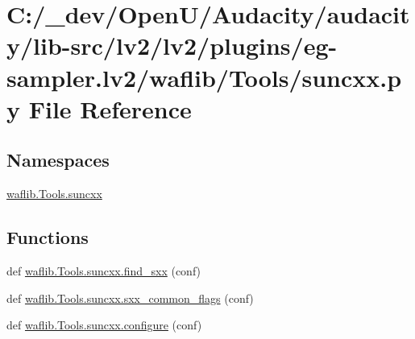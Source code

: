 \hypertarget{lv2_2plugins_2eg-sampler_8lv2_2waflib_2_tools_2suncxx_8py}{}\section{C\+:/\+\_\+dev/\+Open\+U/\+Audacity/audacity/lib-\/src/lv2/lv2/plugins/eg-\/sampler.lv2/waflib/\+Tools/suncxx.py File Reference}
\label{lv2_2plugins_2eg-sampler_8lv2_2waflib_2_tools_2suncxx_8py}
\subsection*{Namespaces}
\begin{DoxyCompactItemize}
\item 
 \hyperlink{namespacewaflib_1_1_tools_1_1suncxx}{waflib.\+Tools.\+suncxx}
\end{DoxyCompactItemize}
\subsection*{Functions}
\begin{DoxyCompactItemize}
\item 
def \hyperlink{namespacewaflib_1_1_tools_1_1suncxx_a88c1361f04aec9dca5a65944c5c06cb9}{waflib.\+Tools.\+suncxx.\+find\+\_\+sxx} (conf)
\item 
def \hyperlink{namespacewaflib_1_1_tools_1_1suncxx_abf9e33c219f7edbbb25eb5360ecf7089}{waflib.\+Tools.\+suncxx.\+sxx\+\_\+common\+\_\+flags} (conf)
\item 
def \hyperlink{namespacewaflib_1_1_tools_1_1suncxx_a07c4b17184f93e69ac10e64f97a20ace}{waflib.\+Tools.\+suncxx.\+configure} (conf)
\end{DoxyCompactItemize}
